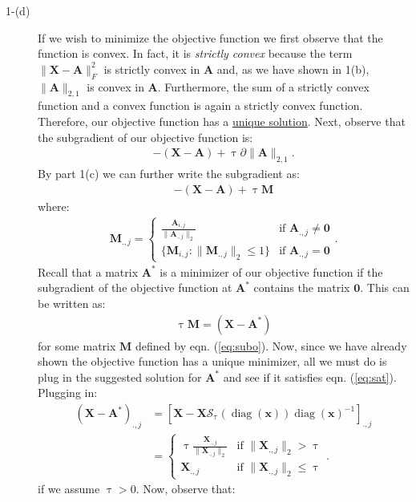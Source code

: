\documentclass[11pt,onside]{article}
\DeclareMathOperator{\diag}{diag}
\begin{document}
\begin{description}
\item[1-(d)] If we wish to minimize the objective function we first observe that the function is convex. In fact, it is {\it{strictly convex}} because the term $\|\bm{X}-\bm{A}\|_F^2$ is strictly convex in $\bm{A}$ and, as we have shown in 1(b), $\|\bm{A}\|_{2,1}$ is convex in $\bm{A}$. Furthermore, the sum of a strictly convex function and a convex function is again a strictly convex function. Therefore, our objective function has a {\underline{unique solution}}. Next, observe that the subgradient of our objective function is:
\begin{align*}
-(\bm{X}-\bm{A})+\uptau\partial\|\bm{A}\|_{2,1}.
\end{align*}
By part 1(c) we can further write the subgradient as:
\begin{align*}
-(\bm{X}-\bm{A})+\uptau\bm{M}
\end{align*}
where:
\begin{align}
\label{eq:subo}
\bm{M}_{.,j}=\begin{cases} \frac{\bm{A}_{i,j}}{\|\bm{A}_{.,j}\|_2} &\mbox{if } \bm{A}_{.,j}\neq \bm{0} \\
\{\bm{M}_{i,j}:\|\bm{M}_{.,j}\|_2\leq 1\} & \mbox{if } \bm{A}_{.,j}=\bm{0} \end{cases}.
\end{align}
Recall that a matrix $\bm{A}^\ast$ is a minimizer of our objective function if the subgradient of the objective function at $\bm{A}^\ast$ contains the matrix $\bm{0}$. This can be written as:
\begin{align}
\label{eq:sat}
\uptau\bm{M}=(\bm{X}-\bm{A}^\ast)
\end{align}
for some matrix $\bm{M}$ defined by eqn. (\ref{eq:subo}). Now, since we have already shown the objective function has a unique minimizer, all we must do is plug in the suggested solution for $\bm{A}^\ast$ and see if it satisfies eqn. (\ref{eq:sat}). Plugging in:
\begin{align*}
(\bm{X}-\bm{A}^\ast)_{.,j}&=[\bm{X}-\bm{X}\mathcal{S}_{\uptau}(\diag(\bm{x}))\diag(\bm{x})^{-1}]_{.,j}\\
&=\begin{cases} \uptau\frac{\bm{X}_{.,j}}{\|\bm{X}_{.,j}\|_2}&\mbox{if } \|\bm{X}_{.,j}\|_2>\uptau \\
\bm{X}_{.,j}& \mbox{if } \|\bm{X}_{.,j}\|_2\leq \uptau
\end{cases}.
\end{align*}
if we assume $\uptau>0$. Now, observe that:
\begin{align*}

\end{align*}
\end{description}
\end{document}
